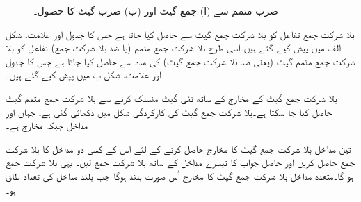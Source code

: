 \begin{figure}
\centering
\begin{subfigure}{1\textwidth}
\centering
{}
\caption{}
\end{subfigure}
\begin{subfigure}{1\textwidth}
\centering
{}
\caption{}
\end{subfigure}
\caption{ضرب متمم سے (ا)  جمع گیٹ  اور (ب)  ضرب گیٹ کا حصول۔}
\label{شکل_بوولین_ضرب_متمم_سے_جمع_ضرب}
\end{figure}


بلا شرکت جمع تفاعل کو بلا شرکت جمع گیٹ  سے حاصل کیا جاتا ہے جس کا جدول اور  علامت،    شکل  -الف  میں پیش   کیے گئے ہیں۔اسی طرح بلا شرکت  جمع متمم  (یا ضد بلا شرکت جمع)   تفاعل کو  بلا شرکت جمع متمم  گیٹ (یعنی ضد بلا شرکت جمع گیٹ)    کی مدد سے حاصل کیا جاتا ہے جس کا جدول اور علامت،      شکل-ب میں پیش کیے گئے ہیں۔

بلا شرکت جمع گیٹ کے  مخارج کے ساتھ نفی گیٹ منسلک کرنے سے بلا شرکت جمع متمم  گیٹ حاصل کیا جا سکتا ہے۔بلا شرکت جمع  گیٹ کی کارکردگی شکل  میں دکھائی گئی ہے، جہاں  اور  مداخل جبکہ  مخارج ہے۔
	
تین مداخل  بلا شرکت جمع گیٹ کا مخارج حاصل کرنے کے لئے  اس کے کسی دو مداخل کا بلا شرکت جمع حاصل کریں اور حاصل جواب کا تیسرے مداخل کے ساتھ بلا شرکت جمع  لیں۔ یہی      بلا شرکت جمع ہو گا۔متعدد مداخل  بلا شرکت جمع گیٹ کا مخارج اُس صورت بلند ہوگا  جب  بلند مداخل کی تعداد طاق ہو۔

